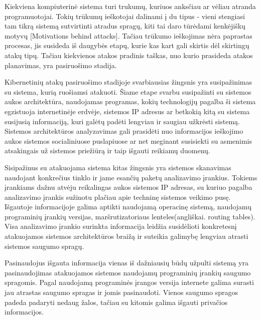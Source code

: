 Kiekviena kompiuterinė sistema turi trukumų, kuriuos anksčiau ar vėliau atranda programuotojai. Tokių trūkumų ieškotojai dalinami į du tipus - vieni stengiasi tam tikrą sistemą sutvirtinti atradus spragų, kiti tai daro tūrėdami kenkėjiškų motyvų [Motivations behind attacks]. Tačiau trūkumo ieškojimas nėra paprastas procesas, jis susideda iš daugybės etapų, kurie kas kart gali skirtis dėl skirtingų atakų tipų. Tačiau kiekvienos atakos pradinis taškas, nuo kurio prasideda atakos planavimas, yra pasiruošimo stadija.

Kibernetinių atakų pasiruošimo stadijoje svarbiausias žingsnis yra susipažinimas su sistema, kurią ruošiamsi atakuoti. Šiame etape svarbu susipažinti su sistemos aukos architektūra, naudojamas programas, kokių technologijų pagalba ši sistema egzistuoja internetinėje erdvėje, sistemos IP adresus ar betkokią kitą su sistema susijusią informaciją, kuri galėtų padėti lengviau ir saugiau užkrėsti sistemą. Sistemos architektūros analyzavimas gali prasidėti nuo informacijos ieškojimo aukos sistemos socialiniuose puslapiuose ar net meginant susisiekti su asmenimis atsakingais už sistemos priežiūrą ir taip išgauti reikiamų duomenų.

Sisipažinus su atakuojama sistema kitas žingsnis yra sistemos skanavimas naudojant konkrečius tinklo ir jame esančių paketų analizavimo įrankius. Tokiems įrankiams dažnu atvėju reikalingas aukos sistemos IP adresas, su kuriuo pagalba analizavimo įrankis sužinotu plačiau apie techninę sistemos veikimo pusę. Išgautoje informacijoje galima aptikti naudojamą operacinę sistemą, naudojamų programinių įrankių versijas, maršrutizatoriaus lenteles(angliškai. routing tables). Visa analizavimo įrankio surinkta informacija leidžia susidėlioti konkretesnį atakuojamos sistemos architektūros braižą ir suteikia galimybę lengviau atrasti sistemos saugumo spragų.

Pasinaudojus išgauta informacija vienas iš dažniausių būdų užpulti sistemą yra pasinaudojimas atakuojamos sistemos naudojamų programinių įrankių saugumo spragomis. Pagal naudojamą programinės įrangos versija internete galima surasti jau atrastas saugumo spragas ir jomis pasinaudoti. Vienos saugumo spragos padeda padaryti nedaug žalos, tačiau su kitomis galima išgauti privačios informacijos.

